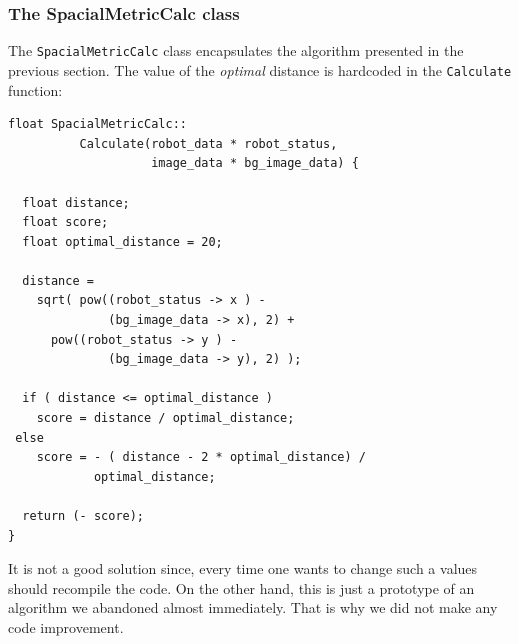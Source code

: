 %
\subsubsection{The SpacialMetricCalc class}
The \texttt{SpacialMetricCalc} class encapsulates the 
algorithm presented in the previous section.
%
The value of the \textit{optimal} distance is hardcoded in the
\texttt{Calculate} function:
%
\begin{lstlisting}[caption={\texttt{SweepMetricCalc} class declaration}, label={code:sweepmetriccalc}, frame=trBL]
float SpacialMetricCalc::
          Calculate(robot_data * robot_status, 
                    image_data * bg_image_data) {

  float distance;
  float score;
  float optimal_distance = 20;

  distance = 
    sqrt( pow((robot_status -> x ) - 
              (bg_image_data -> x), 2) +
	  pow((robot_status -> y ) - 
              (bg_image_data -> y), 2) );

  if ( distance <= optimal_distance )
    score = distance / optimal_distance;
 else
    score = - ( distance - 2 * optimal_distance) /
            optimal_distance;

  return (- score);
}
\end{lstlisting}
%
It is not a good solution since, every time one wants to change 
such a values should recompile the code. 
%
On the other hand, this is just a prototype of an algorithm we 
abandoned almost immediately. That is why we did not make any 
code improvement.
%

%

